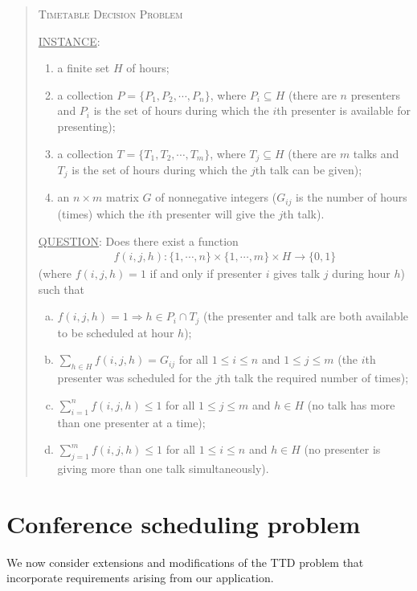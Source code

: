 \documentclass[]{article}
\theoremstyle{definition}
\theoremstyle{remark}
\numberwithin{equation}{section}
\begin{document}
\begin{quote}
	\textsc{Timetable Decision Problem}
	
	\underline{INSTANCE}:
	\begin{enumerate}
		\item a finite set $H$ of hours;
		\item a collection $P = \{P_1, P_2, \cdots, P_n\}$, where $P_i \subseteq H$ (there are $n$ presenters and $P_i$ is the set of hours during which the $i$th presenter is available for presenting);
		\item a collection $T = \{T_1, T_2, \cdots, T_m\}$, where $T_j \subseteq H$ (there are $m$ talks and $T_j$ is the set of hours during which the $j$th talk can be given);
		\item an $n \times m$ matrix $G$ of nonnegative integers ($G_{ij}$ is the number of hours (times) which the $i$th presenter will give the $j$th talk).
	\end{enumerate}
	\underline{QUESTION}: Does there exist a function 
	\begin{gather*}
		f(i,j,h) : \{1,\cdots,n\} \times \{1,\cdots,m\} \times H \rightarrow \{0,1\}
	\end{gather*}
	(where $f(i,j,h)=1$ if and only if presenter $i$ gives talk $j$ during hour $h$) such that
	\begin{enumerate}[(a)]
		\item $f(i,j,h) = 1 \Rightarrow h \in P_i \cap T_j$ (the presenter and talk are both available to be scheduled at hour $h$);
		\item $\sum\limits_{h \in H} f(i,j,h) = G_{ij}$ for all $1 \le i \le n$ and $1 \le j \le m$ (the $i$th presenter was scheduled for the $j$th talk the required number of times);
		\item $\sum\limits_{i=1}^n f(i,j,h) \le 1$ for all $1 \le j \le m$ and $h \in H$ (no talk has more than one presenter at a time);
		\item $\sum\limits_{j=1}^m f(i,j,h) \le 1$ for all $1 \le i \le n$ and $h \in H$ (no presenter is giving more than one talk simultaneously).
	\end{enumerate}
\end{quote}


\section{Conference scheduling problem}\label{sec.desc}
We now consider extensions and modifications of the TTD problem that incorporate requirements arising from our application.
\end{document}
